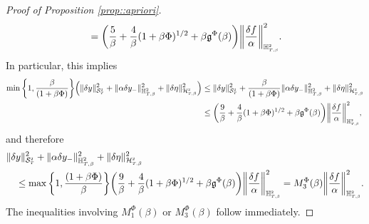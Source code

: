 \documentclass[10pt]{article} %
\newcommand\cH{\mathcal H}
\newcommand\cS{\mathcal S}
\newcommand{\smalltext}[1]{\text{\fontsize{4}{4}\selectfont$#1$}}
\newcommand\fg{\mathfrak g}
\def \H{\mathbb{H}}
\newcommand{\1}{\mathbf{1}}
\begin{document}
\begin{proof}[Proof of Proposition \ref{prop::apriori}]
\begin{align*}
	&\quad= \bigg( \frac{5}{\beta} + \frac{4}{\beta}(1+\beta\Phi)^{1/2} + \beta \fg^\Phi(\beta) \bigg)\bigg\|\frac{\delta f}{\alpha}\bigg\|^2_{\H^\smalltext{2}_{\smalltext{T}\smalltext{,}\smalltext{\beta}}}.
\end{align*}
In particular, this implies
\begin{align*}
	\min\bigg\{1,\frac{\beta}{(1+\beta\Phi)}\bigg\}\Big(\|\delta y\|^2_{\cS^\smalltext{2}_\smalltext{T}} + \|\alpha\delta y_{-}\|^2_{\H^2_{T,\beta}} + \|\delta\eta\|^2_{\cH^\smalltext{2}_{\smalltext{T}\smalltext{,}\beta}}\Big) 
	&\leq \|\delta y\|^2_{\cS^\smalltext{2}_\smalltext{T}} +  \frac{\beta}{(1+\beta\Phi)}\|\alpha\delta y_{-}\|^2_{\H^2_{T,\beta}} + \|\delta\eta\|^2_{\cH^\smalltext{2}_{\smalltext{T}\smalltext{,}\beta}} \\
	&\leq \bigg(\frac{9}{\beta} +\frac{4}{\beta}(1+\beta\Phi)^{1/2} + \beta \fg^\Phi(\beta)\bigg)\bigg\|\frac{\delta f}{\alpha}\bigg\|^2_{\H^\smalltext{2}_{\smalltext{T}\smalltext{,}\smalltext{\beta}}},
\end{align*}
and therefore
\begin{align*}
	&\|\delta y\|^2_{\cS^\smalltext{2}_\smalltext{T}} + \|\alpha\delta y_{-}\|^2_{\H^2_{T,\beta}} + \|\delta\eta\|^2_{\cH^\smalltext{2}_{\smalltext{T}\smalltext{,}\beta}} \\ 
	&\quad\leq \max\bigg\{1,\frac{(1+\beta\Phi)}{\beta}\bigg\}\bigg(\frac{9}{\beta} +\frac{4}{\beta}(1+\beta\Phi)^{1/2} + \beta \fg^\Phi(\beta)\bigg)\bigg\|\frac{\delta f}{\alpha}\bigg\|^2_{\H^\smalltext{2}_{\smalltext{T}\smalltext{,}\smalltext{\beta}}} 
	= M^\Phi_3(\beta)\bigg\|\frac{\delta f}{\alpha}\bigg\|^2_{\H^\smalltext{2}_{\smalltext{T}\smalltext{,}\smalltext{\beta}}}.
\end{align*}
The inequalities involving $M^\Phi_1(\beta)$ or $M^\Phi_3(\beta)$ follow immediately.



\end{proof}
\end{document}
